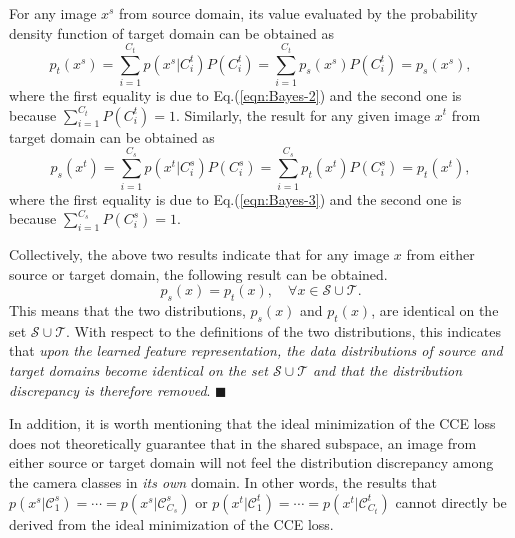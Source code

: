 \documentclass[10pt,twocolumn,letterpaper]{article}
\begin{document}
For any image $x^s$ from source domain, its value evaluated by the probability density function of target domain can be obtained as
\begin{equation}\label{eqn:Bayes-4}
p_t(x^s) = \sum_{i=1}^{C_t}p(x^s|C_{i}^t)P(C_i^t) = \sum_{i=1}^{C_t}p_s(x^s)P(C_i^t) = p_s(x^s), 
\end{equation}where the first equality is due to Eq.(\ref{eqn:Bayes-2}) and the second one is because $\sum_{i=1}^{C_t}P(C_i^t)=1$. Similarly, the result for any given image $x^t$ from target domain can be obtained as
\begin{equation}\label{eqn:Bayes-5}
p_s(x^t) = \sum_{i=1}^{C_s}p(x^t|C_{i}^s)P(C_i^s) = \sum_{i=1}^{C_s}p_t(x^t)P(C_i^s) = p_t(x^t), 
\end{equation}where the first equality is due to Eq.(\ref{eqn:Bayes-3}) and the second one is because $\sum_{i=1}^{C_s}P(C_i^s)=1$. 

Collectively, the above two results indicate that for any image $x$ from either source or target domain, the following result can be obtained. 
\begin{equation}\label{eqn:Bayes-5}
p_s(x) = p_t(x), \quad \forall x \in {\mathcal S}\cup{\mathcal T}.
\end{equation} This means that the two distributions, $p_s(x)$ and $ p_t(x)$, are identical on the set ${\mathcal S}\cup{\mathcal T}$. With respect to the definitions of the two distributions, this indicates that \textit{upon the learned feature representation, the data distributions of source and target domains become identical on the set ${\mathcal S}\cup{\mathcal T}$ and that the distribution discrepancy is therefore removed}. \quad\quad\quad$\blacksquare$

In addition, it is worth mentioning that the ideal minimization of the CCE loss does not theoretically guarantee that in the shared subspace, an image from either source or target domain will not feel the distribution discrepancy among the camera classes in \textit{its own} domain. In other words, the results that $p(x^s|\mathcal{C}^s_1)=\cdots=p(x^s|\mathcal{C}^s_{C_s})$ or $p(x^t|\mathcal{C}^t_1)=\cdots=p(x^t|\mathcal{C}^t_{C_t})$ cannot directly be derived from the ideal minimization of the CCE loss. 
\end{document}
